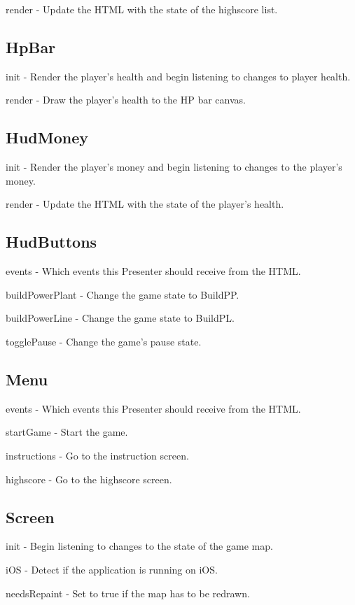 	render - Update the HTML with the state of the highscore list.

\subsection*{HpBar}
	init - Render the player's health and begin listening to changes to player health.

	render - Draw the player's health to the HP bar canvas.

\subsection*{HudMoney}
	init - Render the player's money and begin listening to changes to the player's money.

	render - Update the HTML with the state of the player's health.

\subsection*{HudButtons}

	events - Which events this Presenter should receive from the HTML.

	buildPowerPlant - Change the game state to BuildPP.

	buildPowerLine - Change the game state to BuildPL.

	togglePause - Change the game's pause state.

\subsection*{Menu}

	events - Which events this Presenter should receive from the HTML.

	startGame - Start the game.

	instructions - Go to the instruction screen.

	highscore - Go to the highscore screen.

\subsection*{Screen}

	init - Begin listening to changes to the state of the game map.

	iOS - Detect if the application is running on iOS.

	needsRepaint - Set to true if the map has to be redrawn.

